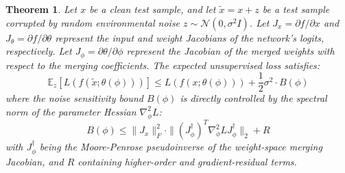 \documentclass{article}
\theoremstyle{plain}
\newtheorem{theorem}{Theorem}[section]
\theoremstyle{definition}
\theoremstyle{remark}
\begin{document}
\begin{theorem}
\label{thm:noise_robustness_bound}
Let $x$ be a clean test sample, and let $\tilde{x} = x + z$ be a test sample corrupted by random environmental noise $z \sim \mathcal{N}(0, \sigma^2 I)$. Let $J_x = \partial f / \partial x$ and $J_\theta = \partial f / \partial \theta$ represent the input and weight Jacobians of the network's logits, respectively. Let $J_\phi = \partial \theta / \partial \phi$ represent the Jacobian of the merged weights with respect to the merging coefficients. The expected unsupervised loss satisfies:
\begin{equation}
\mathbb{E}_z [L(f(\tilde{x}; \theta(\phi)))] \le L(f(x; \theta(\phi))) + \frac{1}{2} \sigma^2 \cdot B(\phi)
\end{equation}
where the noise sensitivity bound $B(\phi)$ is directly controlled by the spectral norm of the parameter Hessian $\nabla^2_\phi L$:
\begin{equation}
B(\phi) \le \|J_x\|^2_F \cdot \|(J^\dagger_\phi)^T \nabla^2_\phi L J^\dagger_\phi\|_2 + R
\end{equation}
with $J^\dagger_\phi$ being the Moore-Penrose pseudoinverse of the weight-space merging Jacobian, and $R$ containing higher-order and gradient-residual terms.
\end{theorem}
\end{document}
